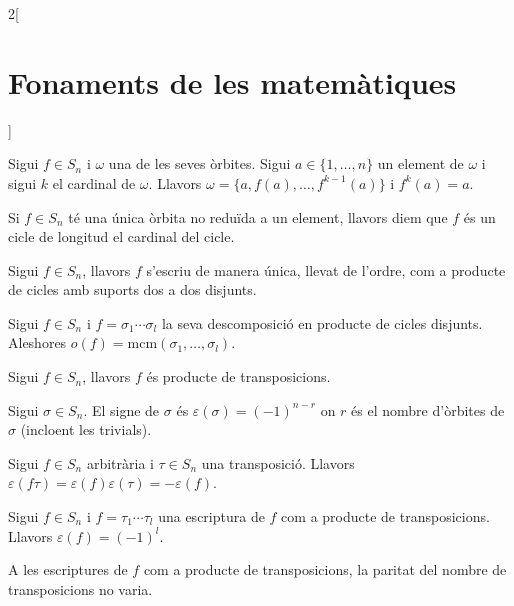\documentclass[../../../main.tex]{subfiles}
\begin{document}
\begin{multicols}{2}[\section{Fonaments de les matemàtiques}]
\begin{theorem}
Sigui $f\in S_n$ i $\omega$ una de les seves òrbites. Sigui $a\in\{1,\ldots,n\}$ un element de $\omega$ i sigui $k$ el cardinal de $\omega$. Llavors $\omega=\{a,f(a),\ldots,f^{k-1}(a)\}$ i $f^k(a)=a$.
\end{theorem}
\begin{definition}
Si $f\in S_n$ té una única òrbita no reduïda a un element, llavors diem que $f$ és un cicle de longitud el cardinal del cicle. 
\end{definition}
\begin{theorem}
Sigui $f\in S_n$, llavors $f$ s'escriu de manera única, llevat de l'ordre, com a producte de cicles amb suports dos a dos disjunts.
\end{theorem}
\begin{corollary}
Sigui $f\in S_n$ i $f=\sigma_1\cdots\sigma_l$ la seva descomposició en producte de cicles disjunts. Aleshores $o(f)=\text{mcm}(\sigma_1,\ldots,\sigma_l)$.
\end{corollary}
\begin{corollary}
Sigui $f\in S_n$, llavors $f$ és producte de transposicions.
\end{corollary}
\begin{definition}
Sigui $\sigma\in S_n$. El signe de $\sigma$ és $\varepsilon(\sigma)=(-1)^{n-r}$ on $r$ és el nombre d'òrbites de $\sigma$ (incloent les trivials).
\end{definition}
\begin{theorem}
Sigui $f\in S_n$ arbitrària i $\tau\in S_n$ una transposició. Llavors $\varepsilon(f\tau)=\varepsilon(f)\varepsilon(\tau)=-\varepsilon(f)$.
\end{theorem}
\begin{corollary}
Sigui $f\in S_n$ i $f=\tau_1\cdots\tau_l$ una escriptura de $f$ com a producte de transposicions. Llavors $\varepsilon(f)=(-1)^l$.
\end{corollary}
\begin{corollary}
A les escriptures de $f$ com a producte de transposicions, la paritat del nombre de transposicions no varia.
\end{corollary}

\end{multicols}
\end{document}
